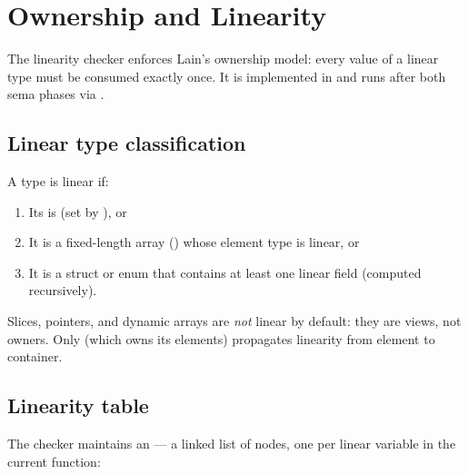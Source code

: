 \chapter{Ownership and Linearity}
\label{chap:12-linearity}

\pnum
The linearity checker enforces Lain's ownership model: every value of a linear
type must be consumed exactly once.  It is implemented in
 and runs after both sema phases via
.

\section{Linear type classification}
\label{sec:lin-class}

\pnum
A type is linear if:
\begin{enumerate}
\item Its  is  (set by ), or
\item It is a fixed-length array () whose element type is linear, or
\item It is a  struct or enum that contains at least one
  linear field (computed recursively).
\end{enumerate}

\pnum
Slices, pointers, and dynamic arrays are \emph{not} linear by default: they are
views, not owners.  Only  (which owns its elements) propagates
linearity from element to container.

\section{Linearity table}
\label{sec:lin-table}

\pnum
The checker maintains an  --- a linked list of 
nodes, one per linear variable in the current function:

